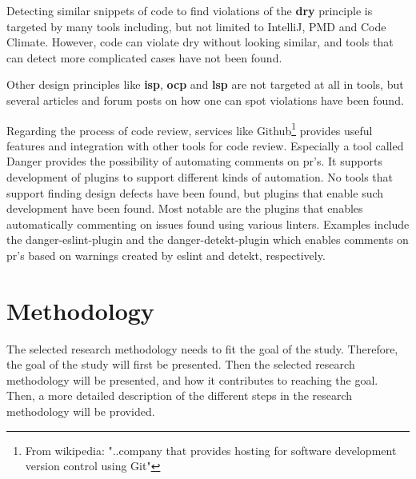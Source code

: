 \documentclass{report}
\begin{document}
Detecting similar snippets of code to find violations of the \textbf{\gls{dry}} principle is targeted by many tools including, but not limited to IntelliJ\cite{IntelliJ}, PMD\cite{pmd} and Code Climate\cite{codeclimate}. However, code can violate \gls{dry} without looking similar, and tools that can detect more complicated cases have not been found.  

Other design principles like \textbf{\gls{isp}}, \textbf{\gls{ocp}} and \textbf{\gls{lsp}} are not targeted at all in tools, but several articles and forum posts on how one can spot violations have been found.  

Regarding the process of code review, services like Github\cite{github}\footnote{From wikipedia: "..company that provides hosting for software development version control using Git"\cite{github-wiki}} provides useful features and integration with other tools for code review. Especially a tool called Danger\cite{danger} provides the possibility of automating comments on \gls{pr}'s. It supports development of plugins to support different kinds of automation. No tools that support finding design defects have been found, but plugins that enable such development have been found. Most notable are the plugins that enables automatically commenting on issues found using various linters. Examples include the danger-eslint-plugin\cite{danger-eslint-plugin} and the danger-detekt-plugin\cite{danger-detekt-plugin} which enables comments on \gls{pr}'s based on warnings created by eslint\cite{eslint} and detekt\cite{detekt}, respectively. 

\chapter{Methodology}

\label{methodology}
The selected research methodology needs to fit the goal of the study. Therefore, the goal of the study will first be presented. Then the selected research methodology will be presented, and how it contributes to reaching the goal. Then, a more detailed description of the different steps in the research methodology will be provided. 
\end{document}
